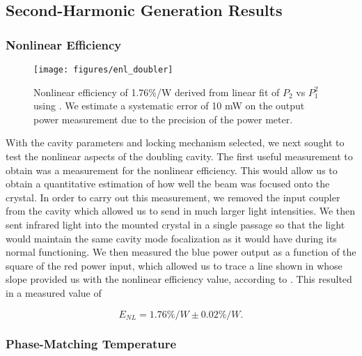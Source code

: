 \subsection{Second-Harmonic Generation Results} 
\label{second_harmonic_generation_results} 



\subsubsection{Nonlinear Efficiency}
\label{4:nonlinear_efficiency} 


\begin{figure}[!ht] 
 \centering 
 \texttt{[image: figures/enl\_doubler]} 
 \caption[Nonlinear efficiency measurement]{Nonlinear efficiency of 1.76\%/W
 derived from linear fit of  $P_2$ vs $P_1^2$ using .  We
 estimate a systematic error of 10 mW on the output power measurement due to the
 precision of the power meter. } 
 \label{fig:enl_doubler} 
\end{figure}

With the cavity parameters and locking mechanism selected, we next sought to test the nonlinear aspects of the doubling cavity.  The first useful measurement to obtain was a measurement for the nonlinear efficiency.  This would allow us to obtain a quantitative estimation of how well the beam was focused onto the crystal.  In order to carry out this measurement, we removed the input coupler from the cavity which allowed us to send in much larger light intensities.  We then sent infrared light into the mounted crystal in a single passage so that the light would maintain the same cavity mode focalization as it would have during its normal functioning.  We then measured the blue power output as a function of the square of the red power input, which allowed us to trace a line shown in  whose slope provided us with the nonlinear efficiency value, according to .  This resulted in a measured value of \cite{villa2007} 

\begin{equation}
  \label{eq:non_lin_meas}
  E_{NL} = 1.76 \%/W \pm 0.02 \%/W.
\end{equation}



\subsubsection{Phase-Matching Temperature}
\label{doubler_phase_matching_temperature} 

